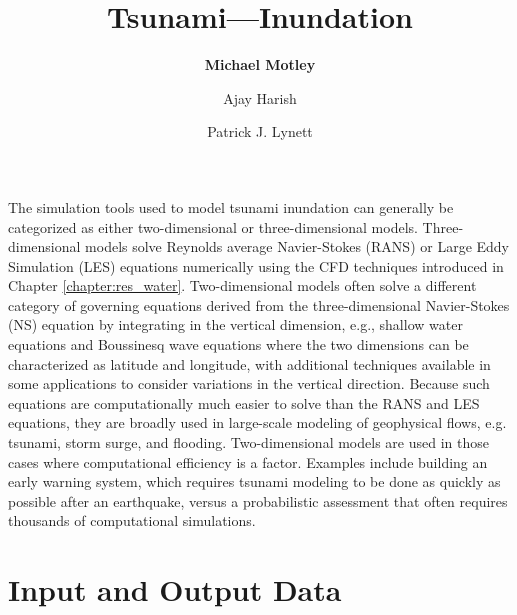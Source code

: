 %
%
%


\title{Tsunami---Inundation}
\author{
    \textbf{Michael Motley} 
    \and Ajay Harish
    \and Patrick J. Lynett}
\tocauthor{}
%
%
\maketitle
\label{chapter:haz_tsunami}

The simulation tools used to model tsunami inundation can generally be categorized as either two-dimensional or three-dimensional models. Three-dimensional models solve Reynolds average Navier-Stokes (RANS) or Large Eddy Simulation (LES) equations numerically using the CFD techniques introduced in Chapter \ref{chapter:res_water}. Two-dimensional models often solve a different category of governing equations derived from the three-dimensional Navier-Stokes (NS) equation by integrating in the vertical dimension, e.g., shallow water equations and Boussinesq wave equations where the two dimensions can be characterized as latitude and longitude, with additional techniques available in some applications to consider variations in the vertical direction. Because such equations are computationally much easier to solve than the RANS and LES equations, they are broadly used in large-scale modeling of geophysical flows, e.g. tsunami, storm surge, and flooding. Two-dimensional models are used in those cases where computational efficiency is a factor. Examples include building an early warning system, which requires tsunami modeling to be done as quickly as possible after an earthquake, versus a probabilistic assessment that often requires thousands of computational simulations.

\section{Input and Output Data}
\label{sec:tsunami_io}


